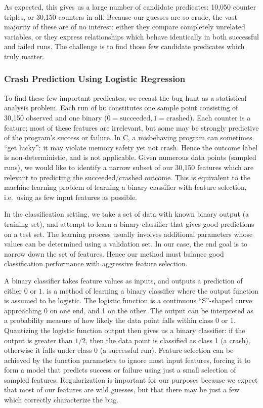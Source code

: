 As expected, this gives us a large number of candidate predicates:
10,050 counter triples, or 30,150 counters in all.  Because our
guesses are so crude, the vast majority of these are of no interest:
either they compare completely unrelated variables, or they express
relationships which behave identically in both successful and failed
runs.  The challenge is to find those few candidate predicates which
truly matter.

\subsubsection{Crash Prediction Using Logistic Regression}

To find these few important predicates, we recast the bug hunt as a
statistical analysis problem.  Each run of \texttt{bc} constitutes one
sample point consisting of 30,150 observed  and one
binary  ($0 = \text{succeeded}, 1 = \text{crashed}$).
Each counter is a feature; most of these features are irrelevant, but
some may be strongly predictive of the program's success or failure.
In C, a misbehaving program can sometimes ``get lucky'': it may
violate memory safety yet not crash.  Hence the outcome label is
non-deterministic, and 
is not applicable.  Given numerous data points (sampled runs), we
would like to identify a narrow subset of our 30,150 features which
are relevant to predicting the succeeded/crashed outcome.  This is
equivalent to the machine learning problem of learning a binary
classifier with feature selection, i.e.\ using as few input features
as possible.

In the classification setting, we take a set of data with known binary
output (a training set), and attempt to learn a binary classifier that
gives good predictions on a test set.  The learning process usually
involves additional parameters whose values can be determined using a
validation set.  In our case, the end goal is to narrow down the set
of features.  Hence our method must balance good
classification performance with aggressive feature selection.

A binary classifier takes feature values as inputs, and outputs a
prediction of either $0$ or $1$.  
\cite{Hastie01} is a method of learning a binary classifier where the
output function is assumed to be logistic.  The logistic function is a
continuous ``S''-shaped curve approaching 0 on one end, and 1 on the
other.  The output can be interpreted as a probability measure of how
likely the data point falls within class 0 or 1.  Quantizing the
logistic function output then gives us a binary classifier: if the
output is greater than $1/2$, then the data point is classified as
class 1 (a crash), otherwise it falls under class 0 (a successful
run).  Feature selection can be achieved by  the
function parameters to ignore most input features, forcing it to form
a model that predicts success or failure using just a small selection
of sampled features.  Regularization is important for our purposes
because we expect that most of our features are wild guesses, but that
there may be just a few which correctly characterize the bug.

